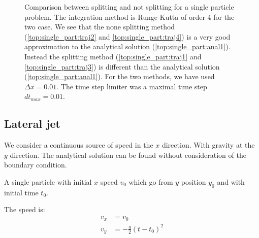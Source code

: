\begin{figure}
\caption{Comparison between splitting and not splitting for a single particle problem. 
The integration method is Runge-Kutta of order 4 for the two case.
We see that the none splitting method (\ref{top:single_part:traj2} and \ref{top:single_part:traj4}) is a very good approximation to the analytical solution (\ref{top:single_part:anal1}).
Instead the splitting method (\ref{top:single_part:traj1} and \ref{top:single_part:traj3}) is different than the analytical solution (\ref{top:single_part:anal1}).
For the two methods, we have used $\Delta x=0.01$. The time step limiter was a maximal time step $dt_{max}=0.01$.
}
\label{topo:singl_part:fig1}
\end{figure}

\subsection{Lateral jet}

We consider a continuous source of speed in the $x$ direction. With gravity at the $y$ direction.
The analytical solution can be found without consideration of the boundary condition.

A single particle with initial $x$ speed $v_{0}$ which go from $y$ position $y_0$ and with initial time $t_0$.

The speed is:
\begin{align}
	v_{x}&=v_{0}\\
	v_{y}&=-\frac{g}{2}(t-t_0)^2
\end{align}

